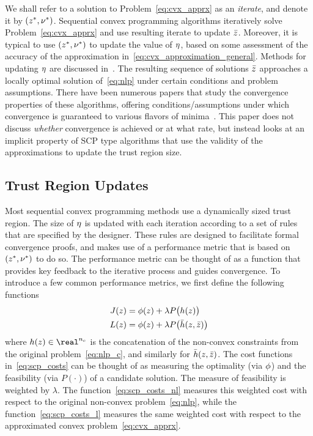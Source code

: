 \documentclass[letterpaper, 10 pt, conference]{ieeeconf}
\begin{document}
We shall refer to a solution to Problem~\eqref{eq:cvx_apprx} as an \textit{iterate}, and denote it by $(z^*,\nu^*)$. Sequential convex programming algorithms iteratively solve Problem~\eqref{eq:cvx_apprx} and use resulting iterate to update $\bar{z}$. Moreover, it is typical to use $(z^*,\nu^*)$ to update the value of $\eta$, based on some assessment of the accuracy of the approximation in~\eqref{eq:cvx_approximation_general}. Methods for updating $\eta$ are discussed in~. The resulting sequence of solutions $\bar{z}$ approaches a locally optimal solution of~\eqref{eq:nlp} under certain conditions and problem assumptions. There have been numerous papers that study the convergence properties of these algorithms, offering conditions/assumptions under which convergence is guaranteed to various flavors of minima~. This paper does not discuss \textit{whether} convergence is achieved or at what rate, but instead looks at an implicit property of SCP type algorithms that use the validity of the approximations to update the trust region size.

\subsection{Trust Region Updates}\label{subsec:tr_updates}

Most sequential convex programming methods use a dynamically sized trust region. The size of $\eta$ is updated with each iteration according to a set of rules that are specified by the designer. These rules are designed to facilitate formal convergence proofs, and makes use of a performance metric that is based on $(z^*,\nu^*)$ to do so. The performance metric can be thought of as a function that provides key feedback to the iterative process and guides convergence. To introduce a few common performance metrics, we first define the following functions
\begin{subequations}\label{eq:scp_costs}
\begin{align}
J(z) &= \phi(z) + \lambda P\big( h(z) \big) \label{eq:scp_costs_nl}\\
L(z) &= \phi(z) + \lambda P\big( \bar{h}(z,\bar{z}) \big) \label{eq:scp_costs_l}
\end{align}
\end{subequations}
where $h(\z) \in \real^{n_e}$ is the concatenation of the non-convex constraints from the original problem~\eqref{eq:nlp_c}, and similarly for $\bar{h}(z,\bar{z})$. The cost functions in~\eqref{eq:scp_costs} can be thought of as measuring the optimality (via $\phi$) and the feasibility (via $P(\cdot)$) of a candidate solution. The measure of feasibility is weighted by $\lambda$. The function~\eqref{eq:scp_costs_nl} measures this weighted cost with respect to the original non-convex problem~\eqref{eq:nlp}, while the function~\eqref{eq:scp_costs_l} measures the same weighted cost with respect to the approximated convex problem~\eqref{eq:cvx_apprx}. 
\end{document}

